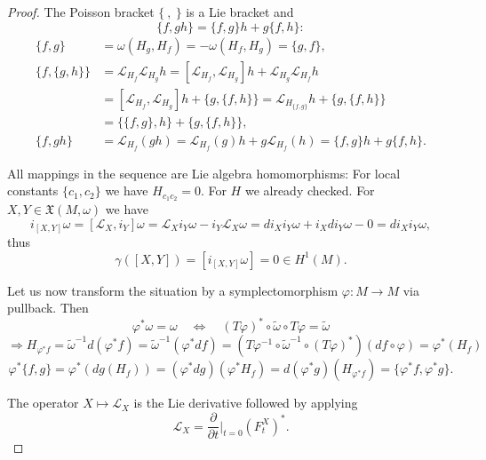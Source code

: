 \documentclass{article}
\numberwithin{theorem}{section}
\theoremstyle{definition}
\begin{document}
\begin{proof}
    The Poisson bracket $\{ \ , \ \}$ is a Lie bracket and 
    \[
    \{f, gh\} = \{f, g\}h + g\{f, h\}:
    \]
    \begin{align}
    \{f, g\} &= \omega(H_g, H_f) = -\omega(H_f, H_g) = \{g, f\}, \\
    \{f, \{g, h\}\} &= \mathcal{L}_{H_f} \mathcal{L}_{H_g} h = [\mathcal{L}_{H_f}, \mathcal{L}_{H_g}] h + \mathcal{L}_{H_g} \mathcal{L}_{H_f} h \\
    &= [\mathcal{L}_{H_f}, \mathcal{L}_{H_g}] h + \{g, \{f, h\}\} = \mathcal{L}_{H_{\{f, g\}}} h + \{g, \{f, h\}\} \\
    &= \{\{f, g\}, h\} + \{g, \{f, h\}\}, \\
    \{f, gh\} &= \mathcal{L}_{H_f}(gh) = \mathcal{L}_{H_f}(g)h + g \mathcal{L}_{H_f}(h) = \{f, g\}h + g\{f, h\}.
    \end{align}

    All mappings in the sequence are Lie algebra homomorphisms: For local constants $\{c_1, c_2\}$ we have $H_{c_1 c_2} = 0$. For $H$ we already checked. For $X, Y \in \mathfrak{X}(M, \omega)$ we have
    \[
    i_{[X, Y]} \omega = [\mathcal{L}_X, i_Y] \omega = \mathcal{L}_X i_Y \omega - i_Y \mathcal{L}_X \omega = d i_X i_Y \omega + i_X d i_Y \omega - 0 = d i_X i_Y \omega,
    \]
    thus 
    \[
    \gamma([X, Y]) = [i_{[X, Y]} \omega] = 0 \in H^1(M).
    \]

    Let us now transform the situation by a symplectomorphism $\varphi: M \to M$ via pullback. Then
    \[
    \varphi^* \omega = \omega \quad \Leftrightarrow \quad (T\varphi)^* \circ \tilde{\omega} \circ T\varphi = \tilde{\omega}
    \]
    \[
    \Rightarrow H_{\varphi^* f} = \tilde{\omega}^{-1} d(\varphi^* f) = \tilde{\omega}^{-1} (\varphi^* df) 
    = (T\varphi^{-1} \circ \tilde{\omega}^{-1} \circ (T\varphi)^*) (d f \circ \varphi)
    = \varphi^*(H_f)
    \]
    \[
    \varphi^* \{f, g\} = \varphi^* (d g (H_f)) = ( \varphi^* dg ) ( \varphi^* H_f ) = d(\varphi^* g)(H_{\varphi^* f}) = \{ \varphi^* f, \varphi^* g \}.
    \]

    The operator $X \mapsto \mathcal{L}_X$ is the Lie derivative followed by applying 
    \[
    \mathcal{L}_X = \frac{\partial}{\partial t} \bigg|_{t=0} (F_t^X)^*.
    \]

\end{proof}

\nocite{*}


\end{document}
